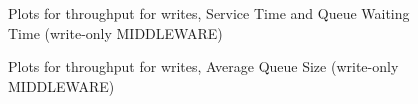 \documentclass[11pt,a4paper]{article}
\begin{document}
\begin{figure}[!h]
  \centering
  \caption{Plots for throughput for writes, Service Time and Queue Waiting Time (write-only MIDDLEWARE)}
  \label{fig:throughput_for_writes_mw_c_wo}
\end{figure}

\begin{figure}[!h]
  \centering
    \caption{Plots for throughput for writes, Average Queue Size (write-only MIDDLEWARE)}
    \label{fig:throughput_for_writes_mw_qs_wo}
\end{figure}
\end{document}
